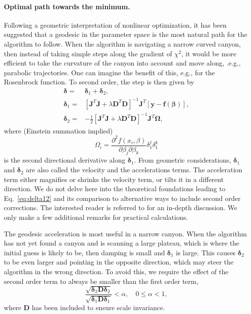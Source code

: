 \documentclass{article}
\begin{document}
\paragraph{Optimal path towards the minimum.} Following a geometric
interpretation of nonlinear optimization, it has been suggested that a
geodesic in the parameter space is the most natural path for the
algorithm to follow. When the algorithm is navigating a narrow curved
canyon, then instead of taking simple steps along the gradient of
$\chi^2$, it would be more efficient to take the curvature of the
canyon into account and move along, .e.g., parabolic trajectories. One
can imagine the benefit of this, e.g., for the Rosenbrock function. To
second order, the step is then given by
\begin{equation}
  \label{eq:delta12}
  \begin{split}
    \bm\delta =& \bm\delta_1 + \bm\delta_2, \\
    \bm\delta_1 =& \left[ \bm J^T \bm J + \lambda\bm D^T\bm D
    \right]^{-1} \bm J^T \left[ \bm y - \bm f(\bm\beta) \right], \\
    \bm\delta_2 =& -\frac{1}{2} \left[ \bm J^T \bm J + \lambda\bm
      D^T\bm D\right]^{-1} \bm J^T \bm\Omega,
  \end{split}
\end{equation}
where (Einstein summation implied)
\begin{equation}
  \label{eq:omega}
  \Omega_i = \frac{\partial^2
    f(x_i,\beta)}{\partial\beta_j \partial\beta_k} \delta_1^j
  \delta_1^k
\end{equation}
is the second directional derivative along $\bm\delta_1$. From
geometric considerations, $\bm\delta_1$ and $\bm\delta_2$ are also
called the velocity and the accelerations terms. The acceleration term
either magnifies or shrinks the velocity term, or tilts it in a
different direction. We do not delve here into the theoretical
foundations leading to Eq.~\eqref{eq:delta12} and its comparison to
alternative ways to include second order corrections. The interested
reader is referred to \cite{transtrum10, transtrum11, transtrum12} for
an in-depth discussion. We only make a few additional remarks for
practical calculations.

The geodesic acceleration is most useful in a narrow canyon. When the
algorithm has not yet found a canyon and is scanning a large plateau,
which is where the initial guess is likely to be, then damping is
small and $\bm\delta_1$ is large. This causes $\bm\delta_2$ to be even
larger and pointing in the opposite direction, which may steer the
algorithm in the wrong direction. To avoid this, we require the effect
of the second order term to always be smaller than the first order
term,
\begin{equation}
  \label{eq:acc_alpha}
  \frac{\sqrt{\bm\delta_2\bm D\bm\delta_2}}{\sqrt{\bm\delta_1\bm
      D\bm\delta_1}} < \alpha, \quad 0 \le \alpha < 1,
\end{equation}
where $\bm D$ has been included to ensure scale invariance.
\end{document}
